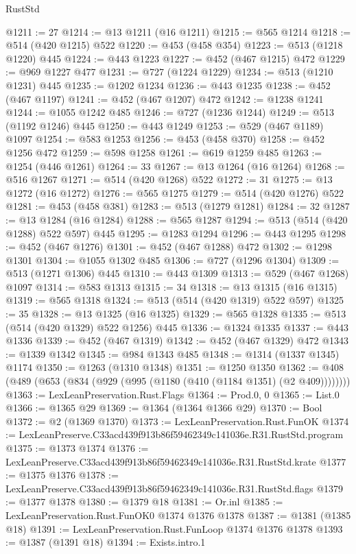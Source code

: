 \begin{lexlean}{RustStd}
\begin{coremodule}
@1211 := 27
@1214 := @13 @1211 (@16 @1211)
@1215 := @565 @1214
@1218 := @514 (@420 @1215) @522
@1220 := @453 (@458 @354)
@1223 := @513 (@1218 @1220) @445
@1224 := @443 @1223
@1227 := @452 (@467 @1215) @472
@1229 := @969 @1227 @477
@1231 := @727 (@1224 @1229)
@1234 := @513 (@1210 @1231) @445
@1235 := @1202 @1234
@1236 := @443 @1235
@1238 := @452 (@467 @1197)
@1241 := @452 (@467 @1207) @472
@1242 := @1238 @1241
@1244 := @1055 @1242 @485
@1246 := @727 (@1236 @1244)
@1249 := @513 (@1192 @1246) @445
@1250 := @443 @1249
@1253 := @529 (@467 @1189) @1097
@1254 := @583 @1253
@1256 := @453 (@458 @370)
@1258 := @452 @1256 @472
@1259 := @598 @1258
@1261 := @619 @1259 @485
@1263 := @1254 (@446 @1261)
@1264 := 33
@1267 := @13 @1264 (@16 @1264)
@1268 := @516 @1267
@1271 := @514 (@420 @1268) @522
@1272 := 31
@1275 := @13 @1272 (@16 @1272)
@1276 := @565 @1275
@1279 := @514 (@420 @1276) @522
@1281 := @453 (@458 @381)
@1283 := @513 (@1279 @1281)
@1284 := 32
@1287 := @13 @1284 (@16 @1284)
@1288 := @565 @1287
@1294 := @513 (@514 (@420 @1288) @522 @597) @445
@1295 := @1283 @1294
@1296 := @443 @1295
@1298 := @452 (@467 @1276)
@1301 := @452 (@467 @1288) @472
@1302 := @1298 @1301
@1304 := @1055 @1302 @485
@1306 := @727 (@1296 @1304)
@1309 := @513 (@1271 @1306) @445
@1310 := @443 @1309
@1313 := @529 (@467 @1268) @1097
@1314 := @583 @1313
@1315 := 34
@1318 := @13 @1315 (@16 @1315)
@1319 := @565 @1318
@1324 := @513 (@514 (@420 @1319) @522 @597)
@1325 := 35
@1328 := @13 @1325 (@16 @1325)
@1329 := @565 @1328
@1335 := @513 (@514 (@420 @1329) @522 @1256) @445
@1336 := @1324 @1335
@1337 := @443 @1336
@1339 := @452 (@467 @1319)
@1342 := @452 (@467 @1329) @472
@1343 := @1339 @1342
@1345 := @984 @1343 @485
@1348 := @1314 (@1337 @1345) @1174
@1350 := @1263 (@1310 @1348)
@1351 := @1250 @1350
@1362 := @408 (@489 (@653 (@834 (@929 (@995 (@1180 (@410 (@1184 @1351) (@2 @409))))))))
@1363 := LexLeanPreservation.Rust.Flags
@1364 := Prod.{0, 0}
@1365 := List.{0}
@1366 := @1365 @29
@1369 := @1364 (@1364 @1366 @29)
@1370 := Bool
@1372 := @2 (@1369 @1370)
@1373 := LexLeanPreservation.Rust.FunOK
@1374 := LexLeanPreserve.C33acd439f913b86f59462349c141036e.R31.RustStd.program
@1375 := @1373 @1374
@1376 := LexLeanPreserve.C33acd439f913b86f59462349c141036e.R31.RustStd.krate
@1377 := @1375 @1376
@1378 := LexLeanPreserve.C33acd439f913b86f59462349c141036e.R31.RustStd.flags
@1379 := @1377 @1378
@1380 := @1379 @18
@1381 := Or.inl
@1385 := LexLeanPreservation.Rust.FunOK0 @1374 @1376 @1378
@1387 := @1381 (@1385 @18)
@1391 := LexLeanPreservation.Rust.FunLoop @1374 @1376 @1378
@1393 := @1387 (@1391 @18)
@1394 := Exists.intro.{1}

\end{coremodule}
\end{lexlean}
